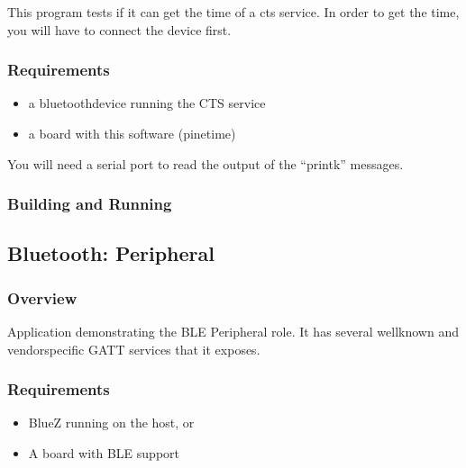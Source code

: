 \documentclass[letterpaper,10pt,english]{sphinxmanual}
\begin{document}
This program tests if it can get the time of a cts service. In order to get the time, you will have to connect the device first.


\subsubsection{Requirements}
\label{\detokenize{samples/bluetooth/peripheral-cts/README:requirements}}\begin{itemize}
\item {} 
a bluetoothdevice running the CTS service

\item {} 
a board with this software (pinetime)

\end{itemize}

You will need a serial port to read the output of the “printk” messages.


\subsubsection{Building and Running}
\label{\detokenize{samples/bluetooth/peripheral-cts/README:building-and-running}}

\subsection{Bluetooth: Peripheral}
\label{\detokenize{samples/bluetooth/peripheral/README:bluetooth-peripheral}}\label{\detokenize{samples/bluetooth/peripheral/README:ble-peripheral}}\label{\detokenize{samples/bluetooth/peripheral/README::doc}}

\subsubsection{Overview}
\label{\detokenize{samples/bluetooth/peripheral/README:overview}}
Application demonstrating the BLE Peripheral role. It has several well\sphinxhyphen{}known and
vendor\sphinxhyphen{}specific GATT services that it exposes.


\subsubsection{Requirements}
\label{\detokenize{samples/bluetooth/peripheral/README:requirements}}\begin{itemize}
\item {} 
BlueZ running on the host, or

\item {} 
A board with BLE support

\end{itemize}
\end{document}
